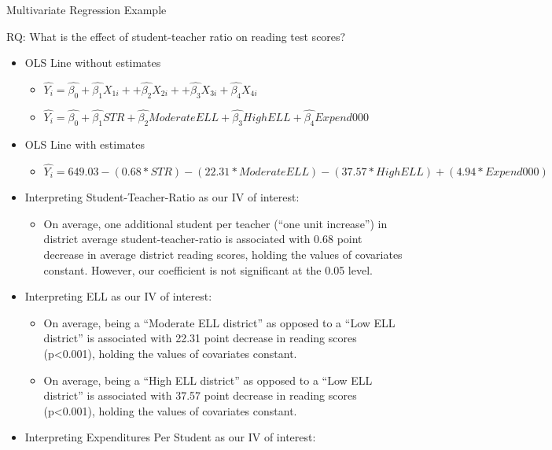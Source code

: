 \documentclass[
  8pt,
  ignorenonframetext,
  dvipsnames]{beamer}
\providecommand{\tightlist}{%
  \setlength{\itemsep}{0pt}\setlength{\parskip}{0pt}}
\let\olditem\item
\renewcommand{\item}{%
  \olditem\vspace{4pt}
}
\begin{document}
\begin{frame}{Multivariate Regression Example}
\protect\hypertarget{multivariate-regression-example-2}{}

RQ: What is the effect of student-teacher ratio on reading test scores?

\begin{itemize}
\tightlist
\item
  OLS Line without estimates

  \begin{itemize}
  \tightlist
  \item
    \(\hat{Y_i} = \hat{\beta_0} + \hat{\beta_1}X_{1i} + + \hat{\beta_2}X_{2i} + + \hat{\beta_3}X_{3i} + \hat{\beta_4}X_{4i}\)
  \item
    \(\hat{Y_i} = \hat{\beta_0} + \hat{\beta_1}STR + \hat{\beta_2}ModerateELL + \hat{\beta_3}HighELL + \hat{\beta_4}Expend000\)
  \end{itemize}
\item
  OLS Line with estimates

  \begin{itemize}
  \tightlist
  \item
    \(\hat{Y_i} = 649.03 - (0.68*STR) - (22.31*ModerateELL) - (37.57*HighELL) + (4.94*Expend000)\)
  \end{itemize}
\item
  Interpreting Student-Teacher-Ratio as our IV of interest:

  \begin{itemize}
  \tightlist
  \item
    On average, one additional student per teacher (``one unit
    increase'') in district average student-teacher-ratio is associated
    with 0.68 point decrease in average district reading scores, holding
    the values of covariates constant. However, our coefficient is not
    significant at the 0.05 level.
  \end{itemize}
\item
  Interpreting ELL as our IV of interest:

  \begin{itemize}
  \tightlist
  \item
    On average, being a ``Moderate ELL district'' as opposed to a ``Low
    ELL district'' is associated with 22.31 point decrease in reading
    scores (p\textless0.001), holding the values of covariates constant.
  \item
    On average, being a ``High ELL district'' as opposed to a ``Low ELL
    district'' is associated with 37.57 point decrease in reading scores
    (p\textless0.001), holding the values of covariates constant.
  \end{itemize}
\item
  Interpreting Expenditures Per Student as our IV of interest:


\end{itemize}
\end{frame}
\end{document}
